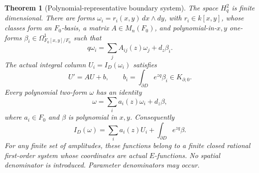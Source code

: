 \documentclass[11pt]{article}
\numberwithin{equation}{section}
\newtheorem{theorem}{Theorem}[section]
\theoremstyle{definition}
\theoremstyle{remark}
\newcommand{\Hq}{H_q^2}
\begin{document}
\begin{theorem}[Polynomial-representative boundary system]
\label{thm:boundary-system}
The space $\Hq$ is finite dimensional. There are forms
$\omega_i=r_i(x,y)\,dx\wedge dy$, with $r_i\in k[x,y]$, whose classes form
an $F_0$-basis, a matrix $A\in M_n(F_0)$, and polynomial-in-$x,y$ one-forms
$\beta_i\in\Omega^1_{F_0[x,y]/F_0}$ such that
\begin{equation}\label{eq:reduction-system}
 q\omega_i=\sum_jA_{ij}(z)\omega_j+d_z\beta_i.
\end{equation}
The actual integral column $U_i=I_D(\omega_i)$ satisfies
\begin{equation}\label{eq:actual-system}
 U'=AU+b,\qquad b_i=\int_{\partial D}e^{zq}\beta_i\in K_{\partial,0}.
\end{equation}
Every polynomial two-form $\omega$ has an identity
\begin{equation}\label{eq:amplitude-normal}
 \omega=\sum_i a_i(z)\omega_i+d_z\beta,
\end{equation}
where $a_i\in F_0$ and $\beta$ is polynomial in $x,y$. Consequently
\begin{equation}\label{eq:actual-normal}
 I_D(\omega)=\sum_i a_i(z)U_i+
              \int_{\partial D}e^{zq}\beta.
\end{equation}
For any finite set of amplitudes, these functions belong to a finite closed
rational first-order system whose coordinates are actual $E$-functions.
No spatial denominator is introduced. Parameter denominators may occur.
\end{theorem}
\end{document}
